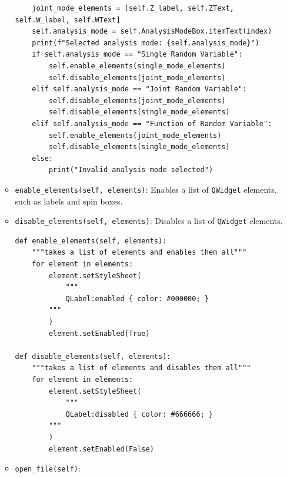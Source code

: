 \documentclass{article}
\begin{document}
\begin{enumerate}
\begin{itemize}
\begin{verbatim}
    joint_mode_elements = [self.Z_label, self.ZText, self.W_label, self.WText]
    self.analysis_mode = self.AnalysisModeBox.itemText(index)
    print(f"Selected analysis mode: {self.analysis_mode}")
    if self.analysis_mode == "Single Random Variable":
        self.enable_elements(single_mode_elements)
        self.disable_elements(joint_mode_elements)
    elif self.analysis_mode == "Joint Random Variable":
        self.disable_elements(joint_mode_elements)
        self.disable_elements(single_mode_elements)
    elif self.analysis_mode == "Function of Random Variable":
        self.enable_elements(joint_mode_elements)
        self.disable_elements(single_mode_elements)
    else:
        print("Invalid analysis mode selected")
            \end{verbatim}
             \item \texttt{enable\_elements(self, elements)}: Enables a list of \texttt{QWidget} elements, such as labels and spin boxes.
             \item \texttt{disable\_elements(self, elements)}: Disables a list of \texttt{QWidget} elements.
               \begin{verbatim}
def enable_elements(self, elements):
    """takes a list of elements and enables them all"""
    for element in elements:
        element.setStyleSheet(
            """
            QLabel:enabled { color: #000000; }
        """
        )
        element.setEnabled(True)

def disable_elements(self, elements):
    """takes a list of elements and disables them all"""
    for element in elements:
        element.setStyleSheet(
            """
            QLabel:disabled { color: #666666; }
        """
        )
        element.setEnabled(False)
               \end{verbatim}

             \item \texttt{open\_file(self)}:


\end{itemize}
\end{enumerate}
\end{document}

